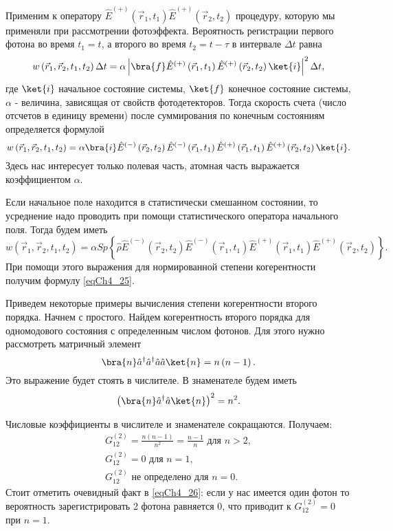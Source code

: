 Применим к оператору $\hat{E}^{(+)}\left(\vec{r}_1, t_1\right)\hat{E}^{(+)}\left(\vec{r}_2,
t_2\right)$ процедуру, которую мы применяли при рассмотрении
фотоэффекта. Вероятность регистрации первого фотона во время $t_1 =
t$, а второго во время $t_2 = t - \tau$ в интервале $\Delta t$ равна
\begin{equation}
w\left(\vec{r}_1, \vec{r}_2, t_1, t_2\right) \Delta t= 
\alpha \left| \bra{f}
\hat{E}^{(+)}\left(\vec{r}_1, t_1\right)\hat{E}^{(+)}\left(\vec{r}_2,
t_2\right)
\ket{i}\right|^2 \Delta t,
\nonumber
\end{equation}
где $\ket{i}$ начальное состояние системы, $\ket{f}$
конечное состояние системы, $\alpha$ - величина, зависящая от свойств
фотодетекторов. Тогда скорость счета (число отсчетов в единицу
времени) после суммирования по конечным состояниям определяется
формулой
\begin{equation}
w\left(\vec{r}_1, \vec{r}_2, t_1, t_2\right) = 
\alpha \bra{i}
\hat{E}^{(-)}\left(\vec{r}_2, t_2\right)\hat{E}^{(-)}\left(\vec{r}_1,
t_1\right)
\hat{E}^{(+)}\left(\vec{r}_1, t_1\right)\hat{E}^{(+)}\left(\vec{r}_2,
t_2\right)
\ket{i}.
\nonumber
\end{equation}
Здесь нас интересует только полевая часть, атомная часть выражается
коэффициентом $\alpha$.

Если начальное поле находится в статистически смешанном состоянии, то
усреднение надо проводить при помощи статистического оператора
начального поля. Тогда будем иметь
\begin{equation}
w\left(\vec{r}_1, \vec{r}_2, t_1, t_2\right) = 
\alpha Sp \left\{\hat{\rho}
\hat{E}^{(-)}\left(\vec{r}_2, t_2\right)\hat{E}^{(-)}\left(\vec{r}_1,
t_1\right)
\hat{E}^{(+)}\left(\vec{r}_1, t_1\right)\hat{E}^{(+)}\left(\vec{r}_2,
t_2\right)
\right\}.
\nonumber
\end{equation}
При помощи этого выражения для нормированной степени
когерентности получим формулу \eqref{eqCh4_25}.

Приведем некоторые примеры вычисления
степени когерентности второго порядка. Начнем с простого. Найдем
когерентность второго порядка для одномодового состояния с
определенным числом фотонов. Для этого нужно рассмотреть матричный
элемент  
\[
\bra{n}\hat{a}^{\dag}\hat{a}^{\dag}\hat{a}\hat{a}\ket{n} = n
\left(n - 1\right).
\]
Это выражение будет стоять в числителе. В знаменателе будем иметь 
\[
\left(\bra{n}\hat{a}^{\dag}\hat{a}\ket{n}\right)^2 = 
n^2.
\]

Числовые коэффициенты в числителе и знаменателе сокращаются. Получаем:
\begin{eqnarray}
G^{(2)}_{12} = \frac{n\left(n - 1\right)}{n^2} = \frac{n - 1}{n} 
\mbox{ для } n > 2,
\nonumber \\
G^{(2)}_{12} = 0
\mbox{ для } n = 1,
\nonumber \\
G^{(2)}_{12} 
\mbox{ не определено для } n = 0.
\label{eqCh4_26}
\end{eqnarray}
Стоит отметить очевидный факт в \eqref{eqCh4_26}: если у нас имеется
один фотон то вероятность зарегистрировать 2 фотона равняется 0, что
приводит к $G^{(2)}_{12} = 0$ при $n=1$.

